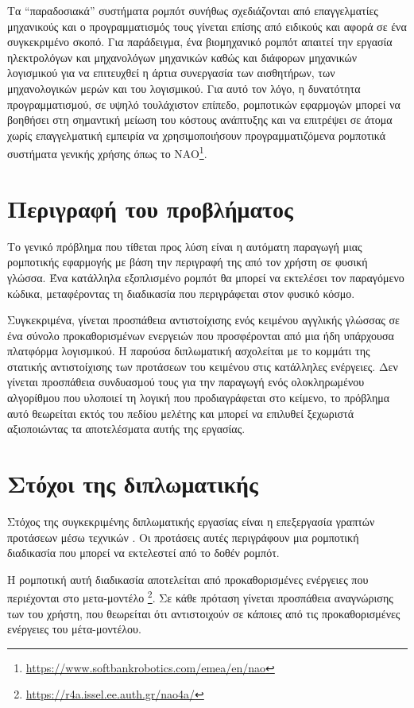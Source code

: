 Τα \enquote{παραδοσιακά} συστήματα ρομπότ συνήθως σχεδιάζονται από επαγγελματίες μηχανικούς και ο προγραμματισμός τους γίνεται επίσης από ειδικούς και αφορά σε ένα συγκεκριμένο σκοπό.
Για παράδειγμα, ένα βιομηχανικό ρομπότ απαιτεί την εργασία ηλεκτρολόγων και μηχανολόγων μηχανικών καθώς και διάφορων μηχανικών λογισμικού για να επιτευχθεί η άρτια συνεργασία των αισθητήρων, των μηχανολογικών μερών και του λογισμικού.
Για αυτό τον λόγο, η δυνατότητα προγραμματισμού, σε υψηλό τουλάχιστον επίπεδο, ρομποτικών εφαρμογών μπορεί να βοηθήσει στη σημαντική μείωση του κόστους ανάπτυξης και να επιτρέψει σε άτομα χωρίς επαγγελματική εμπειρία να χρησιμοποιήσουν προγραμματιζόμενα ρομποτικά συστήματα γενικής χρήσης όπως το NAO\footnote{\url{https://www.softbankrobotics.com/emea/en/nao}}.

\section{Περιγραφή του προβλήματος}\label{sec:problem-description}
Το γενικό πρόβλημα που τίθεται προς λύση είναι η αυτόματη παραγωγή μιας ρομποτικής εφαρμογής με βάση την περιγραφή της από τον χρήστη σε φυσική γλώσσα.
Ένα κατάλληλα εξοπλισμένο ρομπότ θα μπορεί να εκτελέσει τον παραγόμενο κώδικα, μεταφέροντας τη διαδικασία που περιγράφεται στον φυσικό κόσμο.

Συγκεκριμένα, γίνεται προσπάθεια αντιστοίχισης ενός κειμένου αγγλικής γλώσσας σε ένα σύνολο προκαθορισμένων ενεργειών που προσφέρονται από μια ήδη υπάρχουσα πλατφόρμα λογισμικού.
Η παρούσα διπλωματική ασχολείται με το κομμάτι της στατικής αντιστοίχισης των προτάσεων του κειμένου στις κατάλληλες ενέργειες.
Δεν γίνεται προσπάθεια συνδυασμού τους για την παραγωγή ενός ολοκληρωμένου αλγορίθμου που υλοποιεί τη λογική που προδιαγράφεται στο κείμενο,
το πρόβλημα αυτό θεωρείται εκτός του πεδίου μελέτης και μπορεί να επιλυθεί ξεχωριστά αξιοποιώντας τα αποτελέσματα αυτής της εργασίας.

\section{Στόχοι της διπλωματικής}\label{sec:diploma-purpose}
Στόχος της συγκεκριμένης διπλωματικής εργασίας είναι η επεξεργασία γραπτών προτάσεων μέσω τεχνικών
.
Οι προτάσεις αυτές περιγράφουν μια ρομποτική διαδικασία που μπορεί να εκτελεστεί από το δοθέν ρομπότ.

Η ρομποτική αυτή διαδικασία αποτελείται από προκαθορισμένες ενέργειες που περιέχονται στο μετα-μοντέλο \metamodel{}\footnote{\url{https://r4a.issel.ee.auth.gr/nao4a/}}.
Σε κάθε πρόταση γίνεται προσπάθεια αναγνώρισης των  του χρήστη,
που θεωρείται ότι αντιστοιχούν σε κάποιες από τις προκαθορισμένες ενέργειες του μέτα-μοντέλου.

